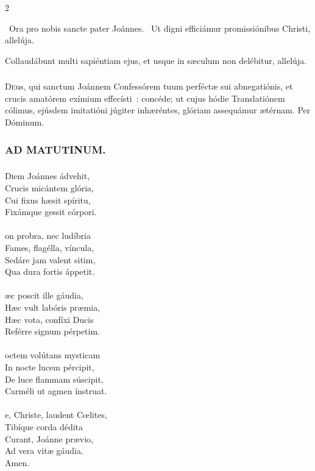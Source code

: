 \documentclass[9pt,twoside]{extarticle}
\begin{document}
\begin{multicols}{2}
{{\begin{tightlist}{}
\item {}~Ora pro nobis sancte pater Joánnes. ~Ut digni efficiámur promissiónibus Christi, allelúja.
\item {} Collaudábunt multi sapiéntiam ejus, et usque in sæculum non delébitur, allelúja.
\end{tightlist}

\subsubsection*{\center {}}
\lettrine{D}eus, qui sanctum Joánnem Confessórem tuum perféctæ sui abnegatiónis, et crucis amatórem exímium effecísti~: concéde; ut cujus hódie Translatiónem cólimus, ejúsdem imitatióni júgiter inhæréntes, glóriam assequámur ætérnam. Per Dóminum.

\subsubsection*{\center \textsc{AD MATUTINUM.}}
\subsubsection*{\center {}}
\lettrine{D}iem Joánnes ádvehit,\\
Crucis micántem glória,\\
Cui fixus hæsit spíritu,\\
Fixámque gessit córpori.\\
\\
on probra, nec ludíbria\\
Fames, flagélla, víncula,\\
Sedáre jam valent sitim,\\
Qua dura fortis áppetit.\\
\\
æc poscit ille gáudia,\\
Hæc vult labóris præmia,\\
Hæc vota, confíxi Ducis\\
Reférre signum pérpetim.\\
\\
octem volútans mysticam\\
In nocte lucem pércipit,\\
De luce flammam súscipit,\\
Carméli ut agmen ínstruat.\\
\\
e, Christe, laudent Cœlites,\\
Tibíque corda dédita\\
Curant, Joánne prævio,\\
Ad vera vitæ gáudia.\\
Amen.

}}
\end{multicols}
\end{document}
